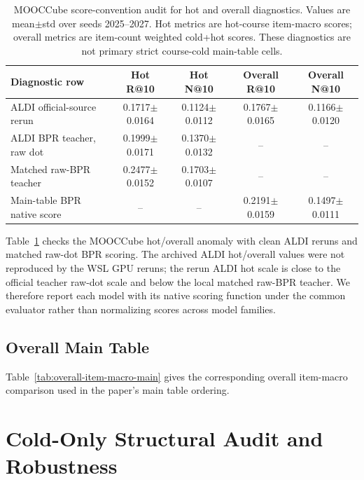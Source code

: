 \documentclass[letterpaper]{article}
\newcommand{\sd}[1]{{\footnotesize$\pm$#1}}
\newcommand{\tablecaptiongap}{\vspace{0.35em}}
\begin{document}
\begin{table}[t]
\centering
\caption{MOOCCube score-convention audit for hot and overall diagnostics. Values are mean\(\pm\)std over seeds 2025--2027. Hot metrics are hot-course item-macro scores; overall metrics are item-count weighted cold+hot scores. These diagnostics are not primary strict course-cold main-table cells.}
\label{tab:supp-score-convention-audit}
\tablecaptiongap
\small
\begin{tabular*}{\textwidth}{@{\extracolsep{\fill}}lcccc}
\toprule
Diagnostic row & Hot R@10 & Hot N@10 & Overall R@10 & Overall N@10 \\
\midrule
ALDI official-source rerun & 0.1717\sd{0.0164} & 0.1124\sd{0.0112} & 0.1767\sd{0.0165} & 0.1166\sd{0.0120} \\
ALDI BPR teacher, raw dot & 0.1999\sd{0.0171} & 0.1370\sd{0.0132} & -- & -- \\
Matched raw-BPR teacher & 0.2477\sd{0.0152} & 0.1703\sd{0.0107} & -- & -- \\
Main-table BPR native score & -- & -- & 0.2191\sd{0.0159} & 0.1497\sd{0.0111} \\
\bottomrule
\end{tabular*}
\end{table}

Table~\ref{tab:supp-score-convention-audit} checks the MOOCCube hot/overall anomaly with clean ALDI reruns and matched raw-dot BPR scoring. The archived ALDI hot/overall values were not reproduced by the WSL GPU reruns; the rerun ALDI hot scale is close to the official teacher raw-dot scale and below the local matched raw-BPR teacher. We therefore report each model with its native scoring function under the common evaluator rather than normalizing scores across model families.

\subsection{Overall Main Table}

Table~\ref{tab:overall-item-macro-main} gives the corresponding overall item-macro comparison used in the paper's main table ordering.




\clearpage

\section{Cold-Only Structural Audit and Robustness}
\end{document}

